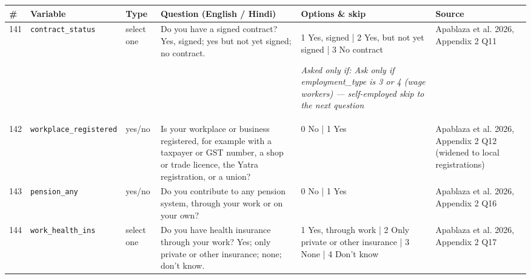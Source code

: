\documentclass[9pt,a4paper,landscape]{article}
\begin{document}
\begin{longtable}{@{}p{0.5cm}p{3.3cm}p{1.7cm}p{7.3cm}p{5.6cm}p{5.4cm}@{}}
\toprule \footnotesize\textbf{\#} & \footnotesize\textbf{Variable} & \footnotesize\textbf{Type} & \footnotesize\textbf{Question (English / Hindi)} & \footnotesize\textbf{Options {\&} skip} & \footnotesize\textbf{Source}\\ \midrule
\endhead
\footnotesize 141 & \footnotesize\texttt{contract\_status} & \scriptsize select one & \footnotesize Do you have a signed contract? Yes, signed; yes but not yet signed; no contract.\par\vspace{1pt}{\footnotesize\color{hdr}{\hifont क्या आपका दस्तख़त किया हुआ अनुबंध (कॉन्ट्रैक्ट) है? हाँ, दस्तख़त किया; हाँ, पर अभी दस्तख़त नहीं हुआ; कोई अनुबंध नहीं।}} & \scriptsize 1 Yes, signed | 2 Yes, but not yet signed | 3 No contract\par\vspace{1pt}\textit{Asked only if: Ask only if employment\_type is 3 or 4 (wage workers) — self-employed skip to the next question} & \scriptsize Apablaza et al. 2026, Appendix 2 Q11\\
\footnotesize 142 & \footnotesize\texttt{workplace\_registered} & \scriptsize yes/no & \footnotesize Is your workplace or business registered, for example with a taxpayer or GST number, a shop or trade licence, the Yatra registration, or a union?\par\vspace{1pt}{\footnotesize\color{hdr}{\hifont क्या आपका काम या धंधा रजिस्टर्ड है, जैसे GST या टैक्स नंबर, दुकान का लाइसेंस, यात्रा का रजिस्ट्रेशन, या कोई यूनियन?}} & \scriptsize 0 No | 1 Yes & \scriptsize Apablaza et al. 2026, Appendix 2 Q12 (widened to local registrations)\\
\footnotesize 143 & \footnotesize\texttt{pension\_any} & \scriptsize yes/no & \footnotesize Do you contribute to any pension system, through your work or on your own?\par\vspace{1pt}{\footnotesize\color{hdr}{\hifont क्या आप किसी पेंशन में पैसा डालते हैं, अपने काम से या अपनी मर्ज़ी से?}} & \scriptsize 0 No | 1 Yes & \scriptsize Apablaza et al. 2026, Appendix 2 Q16\\
\footnotesize 144 & \footnotesize\texttt{work\_health\_ins} & \scriptsize select one & \footnotesize Do you have health insurance through your work? Yes; only private or other insurance; none; don't know.\par\vspace{1pt}{\footnotesize\color{hdr}{\hifont क्या काम की तरफ़ से आपका स्वास्थ्य बीमा है? हाँ; सिर्फ़ अपना या कोई और बीमा; कोई नहीं; पता नहीं।}} & \scriptsize 1 Yes, through work | 2 Only private or other insurance | 3 None | 4 Don't know & \scriptsize Apablaza et al. 2026, Appendix 2 Q17\\

\end{longtable}
\end{document}
